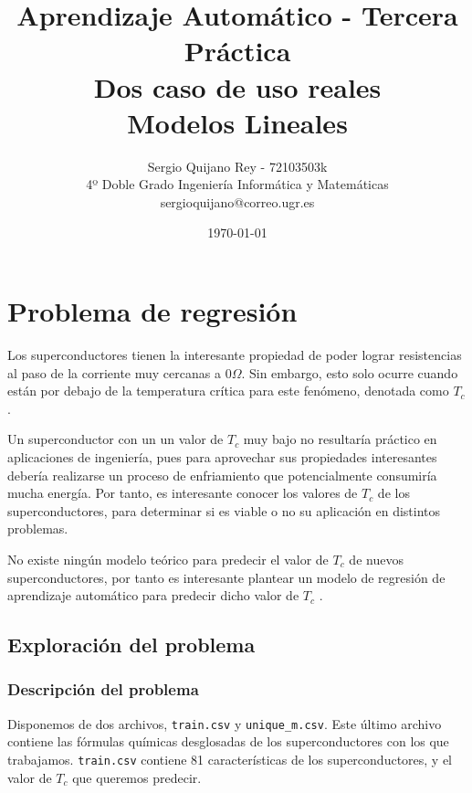 \documentclass[11pt]{article}
\title{
    {Aprendizaje Automático - Tercera Práctica}\\
    {Dos caso de uso reales}\\  %
    {Modelos Lineales}
}
\author{
    {Sergio Quijano Rey - 72103503k}\\
    {4º Doble Grado Ingeniería Informática y Matemáticas}\\
    {sergioquijano@correo.ugr.es}
}
\date{\today}
\begin{document}
\maketitle
\pagebreak

\tableofcontents

\listoffigures

\listoftables

\pagebreak

\section{Problema de regresión}

Los superconductores tienen la interesante propiedad de poder lograr resistencias al paso de la corriente muy cercanas a $0\Omega$. Sin embargo, esto solo ocurre cuando están por debajo de la temperatura crítica para este fenómeno, denotada como $T_c$.

Un superconductor con un un valor de $T_c$ muy bajo no resultaría práctico en aplicaciones de ingeniería, pues para aprovechar sus propiedades interesantes debería realizarse un proceso de enfriamiento que potencialmente consumiría mucha energía. Por tanto, es interesante conocer los valores de $T_c$ de los superconductores, para determinar si es viable o no su aplicación en distintos problemas.

No existe ningún modelo teórico para predecir el valor de $T_c$ de nuevos superconductores, por tanto es interesante plantear un modelo de regresión de aprendizaje automático para predecir dicho valor de $T_c$ \cite{original_paper_reg:paper}.

\subsection{Exploración del problema}

\subsubsection{Descripción del problema}

Disponemos de dos archivos, \lstinline{train.csv} y \lstinline{unique_m.csv}. Este último archivo contiene las fórmulas químicas desglosadas de los superconductores con los que trabajamos. \lstinline{train.csv} contiene 81 características de los superconductores, y el valor de $T_c$ que queremos predecir.
\end{document}
